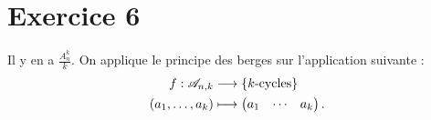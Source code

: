 \part{Exercice 6}

Il y en a $\frac{A_n^k}{k}$. On applique le principe des berges sur l'application suivante :
\begin{align*}
	f: \mathcal{A}_{n,k} &\longrightarrow \{k\text{-cycles}\} \\
	(a_1,\ldots,a_k) &\longmapsto \mat{a_1&\cdots&a_k}.
\end{align*}

